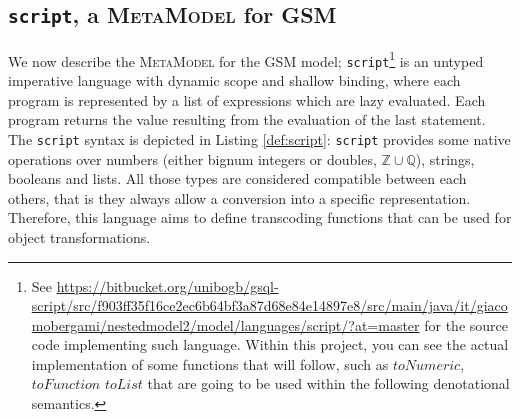 \subsection{\texttt{script}, a \textsc{MetaModel} for GSM}\label{sec:scriptEll}
We now describe the \textsc{MetaModel} for the  GSM model; \texttt{script}\footnote{See \url{https://bitbucket.org/unibogb/gsql-script/src/f903ff35f16ce2ec6b64bf3a87d68e84e14897e8/src/main/java/it/giacomobergami/nestedmodel2/model/languages/script/?at=master} for the source code implementing such language. Within this project, you can see the actual implementation of some functions that will follow, such as $toNumeric$, $toFunction$ $toList$ that are going to be used within the following denotational semantics.} is an untyped imperative language with dynamic scope and shallow binding, where each program is represented by a list of expressions which are lazy evaluated. Each program returns the value  resulting from the evaluation of the last statement. The \texttt{script} syntax is depicted in Listing \vref{def:script}: \texttt{script} provides some native operations over numbers (either bignum integers or doubles, $\mathbb{Z}\cup\mathbb{Q}$), strings, booleans and lists. All those types are considered compatible between each others, that is they always allow a conversion into a specific representation. Therefore, this language aims to define transcoding functions that can be used for object transformations.



